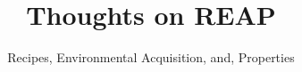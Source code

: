 \documentclass[preprint,10pt,nonatbib]{sigplanconf}
\title{Thoughts on REAP}
\subtitle{Recipes, Environmental Acquisition, and, Properties}
\begin{document}
\maketitle
\eject

\begin{abstract}
  
\end{abstract}

\label{section:tutorial}


\label{section:conclusion}


\small

\end{document}
